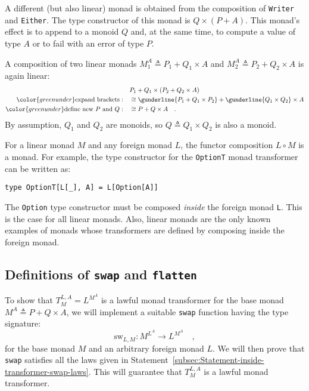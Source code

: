 A different (but also linear) monad is obtained from the composition
of \lstinline!Writer! and \lstinline!Either!. The type constructor
of this monad is $Q\times\left(P+A\right)$. This monad\textsf{'}s effect is
to append to a monoid $Q$ and, at the same time, to compute a value
of type $A$ or to fail with an error of type $P$.

A composition of two linear monads $M_{1}^{A}\triangleq P_{1}+Q_{1}\times A$
and $M_{2}^{A}\triangleq P_{2}+Q_{2}\times A$ is again linear:
\begin{align*}
 & P_{1}+Q_{1}\times\left(P_{2}+Q_{2}\times A\right)\\
{\color{greenunder}\text{expand brackets}:}\quad & \cong\gunderline{P_{1}+Q_{1}\times P_{2}}+\gunderline{Q_{1}\times Q_{2}}\times A\\
{\color{greenunder}\text{define new }P\text{ and }Q:}\quad & \cong P+Q\times A\quad.
\end{align*}
By assumption, $Q_{1}$ and $Q_{2}$ are monoids, so $Q\triangleq Q_{1}\times Q_{2}$
is also a monoid.

For a linear monad $M$ and any foreign monad $L$, the functor composition
$L\circ M$ is a monad. For example, the type constructor for the
\lstinline!OptionT! monad transformer can be written as:
\begin{lstlisting}
type OptionT[L[_], A] = L[Option[A]]
\end{lstlisting}
The \lstinline!Option! type constructor must be composed \emph{inside}
the foreign monad \lstinline!L!. This is the case for all linear
monads. Also, linear monads are the only known examples of monads
whose transformers are defined by composing inside the foreign monad.

\subsection{Definitions of \texttt{swap} and \texttt{flatten}}

To show that $T_{M}^{L,A}=L^{M^{A}}$ is a lawful monad transformer
for the base monad $M^{A}\triangleq P+Q\times A$, we will implement
a suitable \lstinline!swap! function having the type signature:
\[
\text{sw}_{L,M}:M^{L^{A}}\rightarrow L^{M^{A}}\quad,
\]
for the base monad $M$ and an arbitrary foreign monad $L$. We will
then prove that \lstinline!swap! satisfies all the laws given in
Statement~\ref{subsec:Statement-inside-transformer-swap-laws}. This
will guarantee that $T_{M}^{L,A}$ is a lawful monad transformer.

